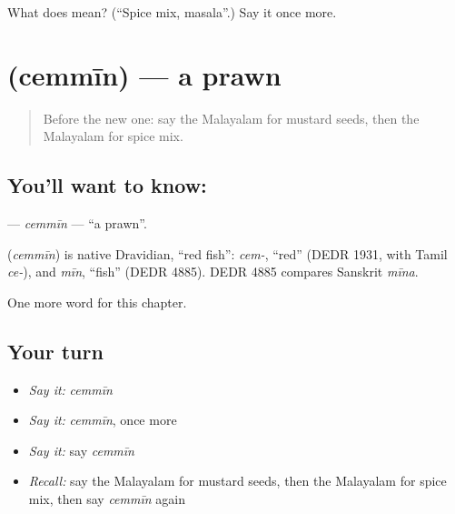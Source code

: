 \begin{tcolorbox}[breakable,colback=teal!4,colframe=teal!35!black,title={Before you move on}]
What does  mean? (\textquotedblleft{}Spice mix, masala\textquotedblright{}.) Say it once more.
\end{tcolorbox}
\section[\texorpdfstring{\ml{ചെമ്മീൻ} (cemmīn)}{ചെമ്മീൻ (cemmīn)}]{ (cemmīn) — a prawn}

\label{lesson:ML-C209-cemmin}



\begin{quote}
Before the new one: say the Malayalam for mustard seeds, then the Malayalam for spice mix.
\end{quote}

\subsection*{You'll want to know: }
\textbf{} — \emph{cemmīn} — \textquotedblleft{}a prawn\textquotedblright{}.

\begin{cousinweb}
\textbf{} (\emph{cemmīn}) is native Dravidian, \textquotedblleft{}red fish\textquotedblright{}: \emph{cem-}, \textquotedblleft{}red\textquotedblright{} (DEDR 1931, with Tamil \emph{ce-}), and \emph{mīn}, \textquotedblleft{}fish\textquotedblright{} (DEDR 4885). DEDR 4885 compares Sanskrit \emph{mīna}.
\end{cousinweb}

\begin{grammarlens}[title={What you've built}]
One more word for this chapter.
\end{grammarlens}

\subsection*{Your turn}
\begin{itemize}
\raggedright
  \item \emph{Say it:} \emph{cemmīn}
  \item \emph{Say it:} \emph{cemmīn}, once more
  \item \emph{Say it:} say \emph{cemmīn}
  \item \emph{Recall:} say the Malayalam for mustard seeds, then the Malayalam for spice mix, then say \emph{cemmīn} again
\end{itemize}

